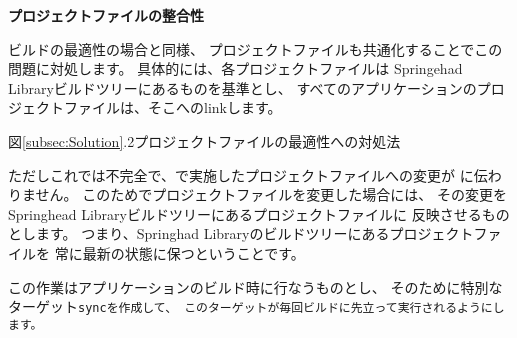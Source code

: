 \medskip
\noindent
\bf{プロジェクトファイルの整合性}
\begin{narrow}[20pt]
	ビルドの最適性の場合と同様、
	プロジェクトファイルも共通化することでこの問題に対処します。
	具体的には、各プロジェクトファイルは
	Springehad Libraryビルドツリーにあるものを基準とし、
	すべてのアプリケーションのプロジェクトファイルは、そこへのlinkします。

	\medskip
    	\begin{narrow}\begin{minipage}{\textwidth}
		\medskip
    	\end{minipage}\end{narrow}
    	\begin{narrow}\begin{minipage}{\textwidth}
		\medskip
  	\end{minipage}\end{narrow}
	\begin{center}図\ref{subsec:Solution}.2プロジェクトファイルの最適性への対処法
	\end{center}

	\medskip
	ただしこれでは不完全で、で実施したプロジェクトファイルへの変更が
	に伝わりません。
	このためでプロジェクトファイルを変更した場合には、
	その変更をSpringhead Libraryビルドツリーにあるプロジェクトファイルに
	反映させるものとします。
	つまり、Springhad Libraryのビルドツリーにあるプロジェクトファイルを
	常に最新の状態に保つということです。

	この作業はアプリケーションのビルド時に行なうものとし、
	そのために特別なターゲット\tt{sync}を作成して、
	このターゲットが毎回ビルドに先立って実行されるようにします。
\end{narrow}

